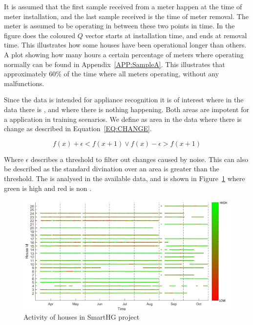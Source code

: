 It is assumed that the first sample received from a meter happen at the time of meter installation, and the last sample received is the time of meter removal. The meter is assumed to be operating in between these two points in time. In the figure does the coloured $Q$ vector starts at installation time, and ends at removal time. This illustrates how some houses have been operational longer than others. A plot showing how many hours a certain percentage of meters where operating normally can be found in Appendix~\ref{APP:SampleA}. This illustrates that approximately 60\% of the time where all meters operating, without any malfunctions.

Since the data is intended for appliance recognition it is of interest where in the data there is , and where there is nothing happening. Both areas are impotent for a  application in training scenarios. We define  as area in the data where there is change as described in Equation~\ref{EQ:CHANGE}.

\begin{equation}
f(x) + \epsilon < f(x+1) \vee f(x) - \epsilon > f(x+1)
\label{EQ:CHANGE}
\end{equation}

Where $\epsilon$ describes a threshold to filter out changes caused by noise. This can also be described as the standard divination over an area is greater than the threshold. The  is analysed in the available data, and is shown in Figure~\ref{fig:ActivityMap} where green is high  and red is non .

\begin{figure}[H]
\centering
\includegraphics[width=1\textwidth]{billeder/ActivityBig.png}
\caption{Activity of houses in SmartHG project}
\label{fig:ActivityMap}
\end{figure}

